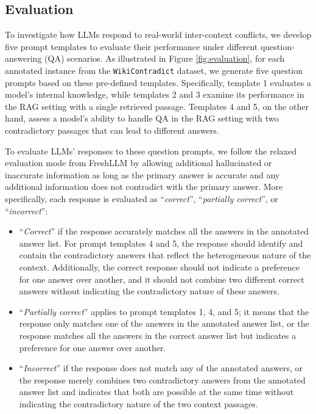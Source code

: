 \documentclass{article}
\begin{document}
\subsection{Evaluation}
\label{sec:evalProtocal}
To investigate how LLMs respond to real-world inter-context conflicts, we develop five prompt templates to evaluate their performance under different question-answering (QA) scenarios.  As illustrated in Figure \ref{fig:evaluation}, for each annotated instance from the \texttt{WikiContradict} dataset, we generate five question prompts based on these pre-defined templates. Specifically, template 1 evaluates a model's internal knowledge, while templates 2 and 3 examine its performance in the RAG setting with a single retrieved passage. Templates 4 and 5, on the other hand, assess a model's ability to handle QA in the RAG setting with two contradictory passages that can lead to different answers.

To evaluate LLMs' responses to these question prompts, we follow the relaxed evaluation mode from FreshLLM \citep{vu2023freshllms} by allowing additional hallucinated or inaccurate information as long as the primary answer is accurate and any additional information does not contradict with the primary answer. More specifically, each response is evaluated as ``\emph{correct}'', ``\emph{partially correct}'', or ``\emph{incorrect}'':
\begin{itemize}
    \item ``\emph{Correct}'' if the response accurately matches all the answers in the annotated answer list. For prompt templates 4 and 5, the response should identify and contain the contradictory answers that reflect the heterogeneous nature of the context. Additionally, the correct response should not indicate a preference for one answer over another, and it should not combine two different correct answers without indicating the contradictory nature of these answers.
    \item ``\emph{Partially correct}'' applies to prompt templates 1, 4, and 5; it means that the response only matches one of the answers in the annotated answer list, or the response matches all the answers in the correct answer list but indicates a preference for one answer over another.
    \item ``\emph{Incorrect}'' if the response does not match any of the annotated answers, or the response merely combines two contradictory answers from the annotated answer list and indicates that both are possible at the same time without indicating the contradictory nature of the two context passages.
\end{itemize}
  
\end{document}
